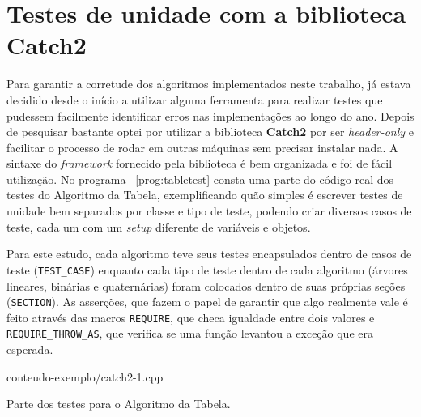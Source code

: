 
\chapter{Testes de unidade com a biblioteca Catch2}
\label{ap:pseudocode}

Para garantir a corretude dos algoritmos implementados neste trabalho, já estava
decidido desde o início a utilizar alguma ferramenta para realizar testes que pudessem
facilmente identificar erros nas implementações ao longo do ano. Depois de pesquisar
bastante optei por utilizar a biblioteca \textbf{Catch2} por ser \textit{header-only}
e facilitar o processo de rodar em outras máquinas sem precisar instalar nada.
A sintaxe do \textit{framework} fornecido pela biblioteca é bem organizada e foi
de fácil utilização. No programa ~\ref{prog:tabletest} consta uma parte do código
real dos testes do Algoritmo da Tabela, exemplificando quão simples é escrever testes
de unidade bem separados por classe e tipo de teste, podendo criar diversos casos de
teste, cada um com um \textit{setup} diferente de variáveis e objetos.

Para este estudo, cada algoritmo teve seus testes encapsulados dentro de casos de teste
(\texttt{TEST\_CASE}) enquanto cada tipo de teste dentro de cada algoritmo (árvores lineares, binárias
e quaternárias) foram colocados dentro de suas próprias seções (\texttt{SECTION}). As asserções, que
fazem o papel de garantir que algo realmente vale é feito através das macros
\texttt{REQUIRE}, que checa igualdade entre dois valores e \texttt{REQUIRE\_THROW\_AS},
que verifica se uma função levantou a exceção que era esperada.

\begin{program}[H]
      
      {conteudo-exemplo/catch2-1.cpp}
    
      \caption{Parte dos testes para o Algoritmo da Tabela.\label{prog:tabletest}}
    \end{program}

